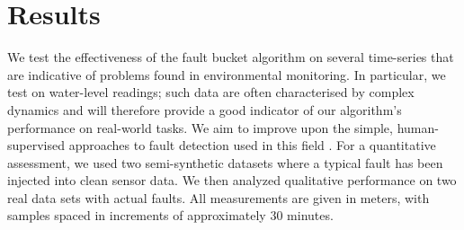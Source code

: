 \documentclass{article} %
\begin{document}
\section{Results}
We test the effectiveness of the fault bucket algorithm on several time-series
that are indicative of problems found in environmental
monitoring. In particular, we test on water-level readings; such data
are often characterised by complex dynamics and will therefore provide
a good indicator of our algorithm's performance on real-world
tasks. We aim to improve upon the simple, human-supervised approaches
to fault detection used in this field
\citep{wagner2006guidelines}. For a quantitative assessment, we used two semi-synthetic datasets
where a typical fault has been injected into clean sensor data. We
then analyzed qualitative performance on two real data sets with actual
faults. All measurements are given in meters, with samples spaced in
increments of approximately 30 minutes. %


\end{document}
